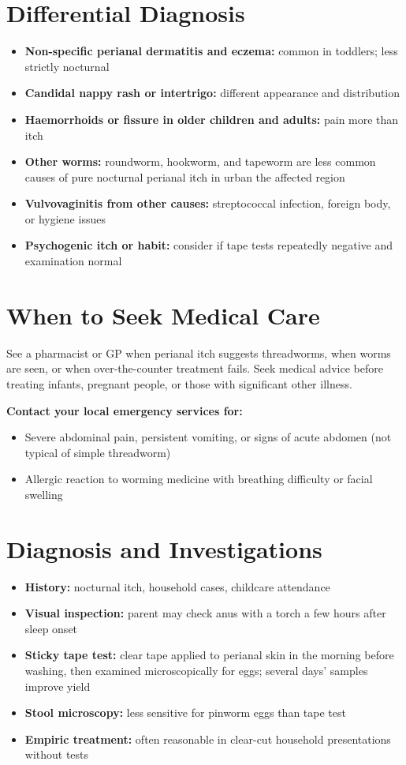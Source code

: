 \section*{Differential Diagnosis}
\begin{itemize}
    \item \textbf{Non-specific perianal dermatitis and eczema:} common in toddlers; less strictly nocturnal
    \item \textbf{Candidal nappy rash or intertrigo:} different appearance and distribution
    \item \textbf{Haemorrhoids or fissure in older children and adults:} pain more than itch
    \item \textbf{Other worms:} roundworm, hookworm, and tapeworm are less common causes of pure nocturnal perianal itch in urban the affected region
    \item \textbf{Vulvovaginitis from other causes:} streptococcal infection, foreign body, or hygiene issues
    \item \textbf{Psychogenic itch or habit:} consider if tape tests repeatedly negative and examination normal
\end{itemize}

\section*{When to Seek Medical Care}
See a pharmacist or GP when perianal itch suggests threadworms, when worms are seen, or when over-the-counter treatment fails. Seek medical advice before treating infants, pregnant people, or those with significant other illness.

\textbf{Contact your local emergency services for:}
\begin{itemize}
    \item Severe abdominal pain, persistent vomiting, or signs of acute abdomen (not typical of simple threadworm)
    \item Allergic reaction to worming medicine with breathing difficulty or facial swelling
\end{itemize}

\section*{Diagnosis and Investigations}
\begin{itemize}
    \item \textbf{History:} nocturnal itch, household cases, childcare attendance
    \item \textbf{Visual inspection:} parent may check anus with a torch a few hours after sleep onset
    \item \textbf{Sticky tape test:} clear tape applied to perianal skin in the morning before washing, then examined microscopically for eggs; several days' samples improve yield
    \item \textbf{Stool microscopy:} less sensitive for pinworm eggs than tape test
    \item \textbf{Empiric treatment:} often reasonable in clear-cut household presentations without tests
\end{itemize}

